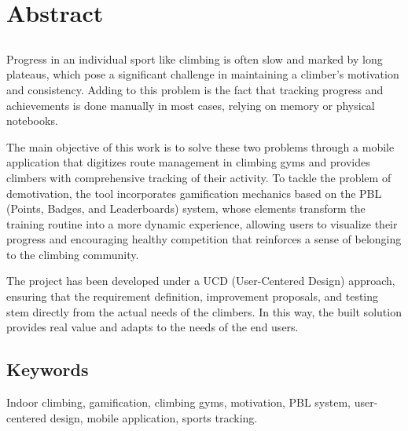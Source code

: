 \chapter*{Abstract}

\section*{\tituloPortadaEngVal}

Progress in an individual sport like climbing is often slow and marked by long plateaus, which pose a significant challenge in maintaining a climber's motivation and consistency. Adding to this problem is the fact that tracking progress and achievements is done manually in most cases, relying on memory or physical notebooks. 

The main objective of this work is to solve these two problems through a mobile application that digitizes route management in climbing gyms and provides climbers with comprehensive tracking of their activity. To tackle the problem of demotivation, the tool incorporates gamification mechanics based on the PBL (Points, Badges, and Leaderboards) system, whose elements transform the training routine into a more dynamic experience, allowing users to visualize their progress and encouraging healthy competition that reinforces a sense of belonging to the climbing community. 

The project has been developed under a UCD (User-Centered Design) approach, ensuring that the requirement definition, improvement proposals, and testing stem directly from the actual needs of the climbers. In this way, the built solution provides real value and adapts to the needs of the end users.

\section*{Keywords}
   
\noindent Indoor climbing, gamification, climbing gyms, motivation, PBL system, user-centered design, mobile application, sports tracking.